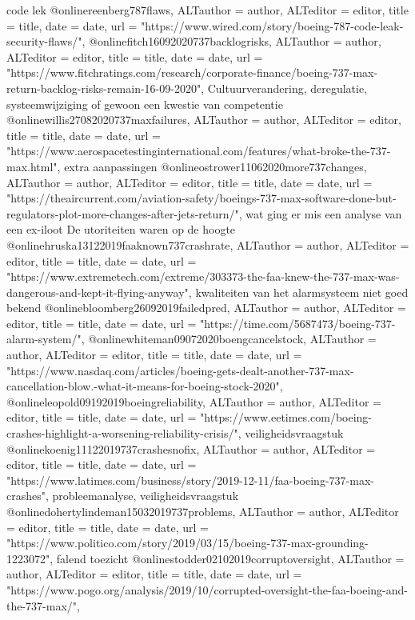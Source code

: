 {{{{{{{{{code lek
@online{reenberg787flaws,	ALTauthor = {author},	ALTeditor = {editor},	title = {title},	date = {date},	url = {"https://www.wired.com/story/boeing-787-code-leak-security-flaws/"},}
@online{fitch16092020737backlogrisks,	ALTauthor = {author},	ALTeditor = {editor},	title = {title},	date = {date},	url = {"https://www.fitchratings.com/research/corporate-finance/boeing-737-max-return-backlog-risks-remain-16-09-2020"},}
Cultuurverandering, deregulatie, systeemwijziging of gewoon een kwestie van competentie
@online{willis27082020737maxfailures,	ALTauthor = {author},	ALTeditor = {editor},	title = {title},	date = {date},	url = {"https://www.aerospacetestinginternational.com/features/what-broke-the-737-max.html"},}
extra aanpassingen
@online{ostrower11062020more737changes,	ALTauthor = {author},	ALTeditor = {editor},	title = {title},	date = {date},	url = {"https://theaircurrent.com/aviation-safety/boeings-737-max-software-done-but-regulators-plot-more-changes-after-jets-return/"},}
wat ging er mis een analyse van een ex-iloot
De utoriteiten waren op de hoogte
@online{hruska13122019faaknown737crashrate,	ALTauthor = {author},	ALTeditor = {editor},	title = {title},	date = {date},	url = {"https://www.extremetech.com/extreme/303373-the-faa-knew-the-737-max-was-dangerous-and-kept-it-flying-anyway"},}
kwaliteiten van het alarmsysteem niet goed bekend
@online{bloomberg26092019failedpred,	ALTauthor = {author},	ALTeditor = {editor},	title = {title},	date = {date},	url = {"https://time.com/5687473/boeing-737-alarm-system/"},}
@online{whiteman09072020boengcancelstock,	ALTauthor = {author},	ALTeditor = {editor},	title = {title},	date = {date},	url = {"https://www.nasdaq.com/articles/boeing-gets-dealt-another-737-max-cancellation-blow.-what-it-means-for-boeing-stock-2020"},}
@online{leopold09192019boeingreliability,	ALTauthor = {author},	ALTeditor = {editor},	title = {title},	date = {date},	url = {"https://www.eetimes.com/boeing-crashes-highlight-a-worsening-reliability-crisis/"},}
veiligheidsvraagstuk
@online{koenig11122019737crashesnofix,	ALTauthor = {author},	ALTeditor = {editor},	title = {title},	date = {date},	url = {"https://www.latimes.com/business/story/2019-12-11/faa-boeing-737-max-crashes"},}
probleemanalyse, veiligheidsvraagstuk
@online{dohertylindeman15032019737problems,	ALTauthor = {author},	ALTeditor = {editor},	title = {title},	date = {date},	url = {"https://www.politico.com/story/2019/03/15/boeing-737-max-grounding-1223072"},}
falend toezicht
@online{stodder02102019corruptoversight,	ALTauthor = {author},	ALTeditor = {editor},	title = {title},	date = {date},	url = {"https://www.pogo.org/analysis/2019/10/corrupted-oversight-the-faa-boeing-and-the-737-max/"},}
}}}}}}}}}
